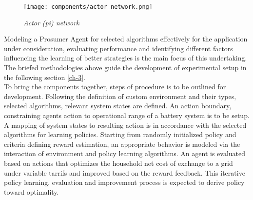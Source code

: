 \begin{large}
\begin{figure}[h]
	\begin{center}
		\texttt{[image: components/actor\_network.png]}
		\caption{ \textit{Actor (pi) network}}
		\label{fig:actor_network}
	\end{center}
\end{figure}


Modeling a Prosumer Agent for selected algorithms effectively for the application under consideration, evaluating performance and identifying different factors influencing the learning of better strategies is the main focus of this undertaking. The briefed methodologies above guide the development of experimental setup in the following section \ref{ch-3}. \\

To bring the components together, steps of procedure is to be outlined for development. Following the definition of custom environment and their types, selected algorithms, relevant system states are defined. An action boundary, constraining agents action to operational range of a battery system is to be setup. A mapping of system states to resulting action is in accordance with the selected algorithms for learning policies. Starting from randomly initialized policy and criteria defining reward estimation, an appropriate behavior is modeled via the interaction of environment and policy learning algorithms.  An agent is evaluated based on actions that optimizes the household net cost of exchange to a grid under variable tarrifs and improved based on the reward feedback. This iterative policy learning, evaluation and improvement process is expected to derive policy toward optimality. \\ 


\end{large}
